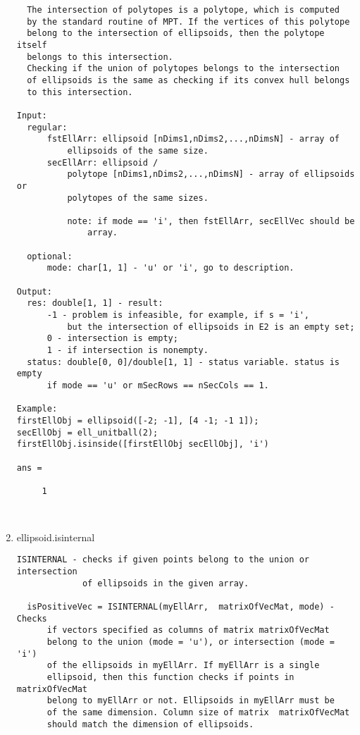 \begin{enumerate}
\begin{lstlisting}
  The intersection of polytopes is a polytope, which is computed
  by the standard routine of MPT. If the vertices of this polytope
  belong to the intersection of ellipsoids, then the polytope itself
  belongs to this intersection.
  Checking if the union of polytopes belongs to the intersection
  of ellipsoids is the same as checking if its convex hull belongs
  to this intersection.

Input:
  regular:
      fstEllArr: ellipsoid [nDims1,nDims2,...,nDimsN] - array of
          ellipsoids of the same size.
      secEllArr: ellipsoid /
          polytope [nDims1,nDims2,...,nDimsN] - array of ellipsoids or
          polytopes of the same sizes.

          note: if mode == 'i', then fstEllArr, secEllVec should be
              array.

  optional:
      mode: char[1, 1] - 'u' or 'i', go to description.

Output:
  res: double[1, 1] - result:
      -1 - problem is infeasible, for example, if s = 'i',
          but the intersection of ellipsoids in E2 is an empty set;
      0 - intersection is empty;
      1 - if intersection is nonempty.
  status: double[0, 0]/double[1, 1] - status variable. status is empty
      if mode == 'u' or mSecRows == nSecCols == 1.

Example:
firstEllObj = ellipsoid([-2; -1], [4 -1; -1 1]);
secEllObj = ell_unitball(2);
firstEllObj.isinside([firstEllObj secEllObj], 'i')

ans =

     1



\end{lstlisting}
\fontfamily{\familydefault}
\selectfont
\item {ellipsoid.isinternal}
\selectfont
\begin{lstlisting}
ISINTERNAL - checks if given points belong to the union or intersection
             of ellipsoids in the given array.

  isPositiveVec = ISINTERNAL(myEllArr,  matrixOfVecMat, mode) - Checks
      if vectors specified as columns of matrix matrixOfVecMat
      belong to the union (mode = 'u'), or intersection (mode = 'i')
      of the ellipsoids in myEllArr. If myEllArr is a single
      ellipsoid, then this function checks if points in matrixOfVecMat
      belong to myEllArr or not. Ellipsoids in myEllArr must be
      of the same dimension. Column size of matrix  matrixOfVecMat
      should match the dimension of ellipsoids.


\end{lstlisting}
\end{enumerate}
